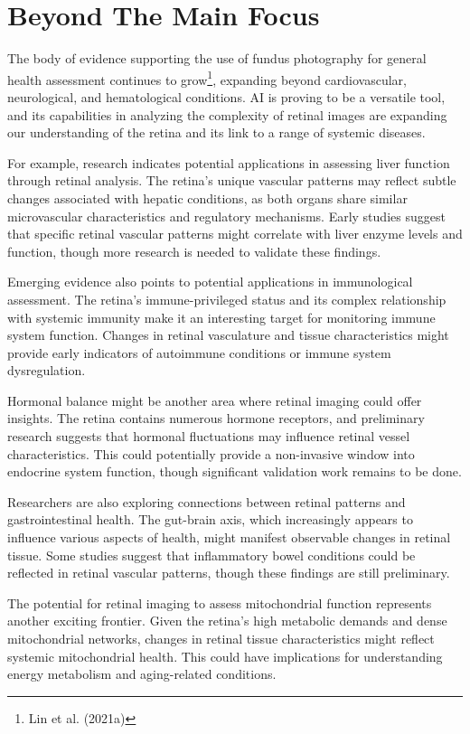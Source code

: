 \documentclass[
  Letterpaper,
]{scrbook}
\begin{document}
\section{Beyond The Main Focus}\label{beyond-the-main-focus}

The body of evidence supporting the use of fundus photography for
general health assessment continues to grow\footnote{Lin et al. (2021a)},
expanding beyond cardiovascular, neurological, and hematological
conditions. AI is proving to be a versatile tool, and its capabilities
in analyzing the complexity of retinal images are expanding our
understanding of the retina and its link to a range of systemic
diseases.

For example, research indicates potential applications in assessing
liver function through retinal analysis. The retina's unique vascular
patterns may reflect subtle changes associated with hepatic conditions,
as both organs share similar microvascular characteristics and
regulatory mechanisms. Early studies suggest that specific retinal
vascular patterns might correlate with liver enzyme levels and function,
though more research is needed to validate these findings.

Emerging evidence also points to potential applications in immunological
assessment. The retina's immune-privileged status and its complex
relationship with systemic immunity make it an interesting target for
monitoring immune system function. Changes in retinal vasculature and
tissue characteristics might provide early indicators of autoimmune
conditions or immune system dysregulation.

Hormonal balance might be another area where retinal imaging could offer
insights. The retina contains numerous hormone receptors, and
preliminary research suggests that hormonal fluctuations may influence
retinal vessel characteristics. This could potentially provide a
non-invasive window into endocrine system function, though significant
validation work remains to be done.

Researchers are also exploring connections between retinal patterns and
gastrointestinal health. The gut-brain axis, which increasingly appears
to influence various aspects of health, might manifest observable
changes in retinal tissue. Some studies suggest that inflammatory bowel
conditions could be reflected in retinal vascular patterns, though these
findings are still preliminary.

The potential for retinal imaging to assess mitochondrial function
represents another exciting frontier. Given the retina's high metabolic
demands and dense mitochondrial networks, changes in retinal tissue
characteristics might reflect systemic mitochondrial health. This could
have implications for understanding energy metabolism and aging-related
conditions.
\end{document}
